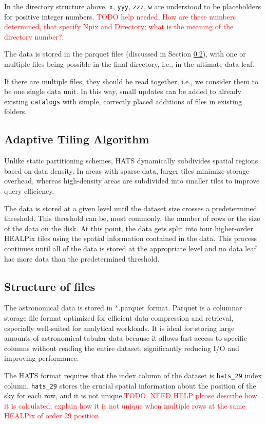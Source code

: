 \documentclass[11pt,a4paper]{ivoa}
\begin{document}
In the directory structure above,   \texttt{x}, \texttt{yyy}, \texttt{zzz}, \texttt{w} are understood to be placeholders for positive integer numbers. \textcolor{red}{TODO help needed, How are these numbers determined, that specify Npix and Directory; what is the meaning of the directory number?}. \par
The data is stored in the parquet files (discussed in Section \ref{sec:parquet}), with one or multiple files being possible in the final directory, i.e., in the ultimate data leaf.  \par 
If there are multiple files, they should be read together, i.e., we consider them to be one single data unit. In this way, small updates can be added to already existing  \texttt{catalogs} with simple, correctly placed additions of files in existing folders.

    \subsection{Adaptive Tiling Algorithm} \label{sec:adaptive}
    Unlike static partitioning schemes, HATS dynamically subdivides spatial regions based on data density. In areas with sparse data, larger tiles minimize storage overhead, whereas high-density areas are subdivided into smaller tiles to improve query efficiency. \par
	The data is stored at a given level until the dataset size crosses a predetermined threshold. This threshold can be, most commonly, the number of rows or the size of the data on the disk. At this point, the data gets split into four higher-order HEALPix tiles using the spatial information contained in the data. This process continues until all of the data is stored at the appropriate level and no data leaf has more data than the predetermined threshold.

     \subsection{Structure of files} \label{sec:parquet}
The astronomical data is stored in *.parquet format. Parquet is a columnar storage file format optimized for efficient data compression and retrieval, especially well-suited for analytical workloads. It is ideal for storing large amounts of astronomical tabular data because it allows fast access to specific columns without reading the entire dataset, significantly reducing I/O and improving performance. \par
The HATS format requires that the index column of the dataset is \texttt{hats\_29} index column.  \texttt{hats\_29} stores the crucial spatial information about the position of the sky for each row, and it is not unique.\textcolor{red}{TODO, NEED HELP please describe how it is calculated; explain how it is not unique when multiple rows at the same HEALPix of order 29 position} 
\end{document}
